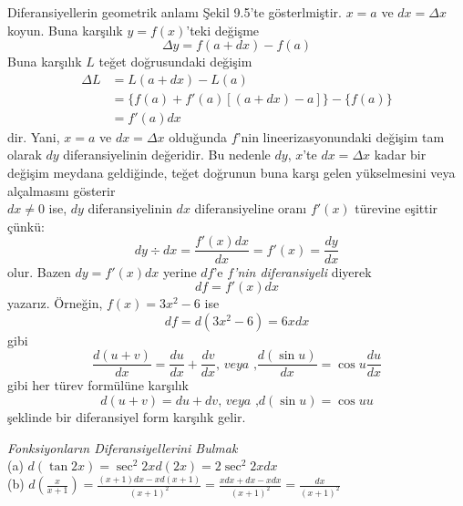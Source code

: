 Diferansiyellerin geometrik anlamı Şekil 9.5'te gösterlmiştir. $x=a$ ve $dx=\varDelta x$ koyun. Buna karşılık $y=f(x)$'teki değişme
	\begin{equation*}
	\varDelta y= f(a+dx)-f(a)
	\end{equation*}
Buna karşılık $L$ teğet doğrusundaki değişim
	\begin{equation*}
	\begin{split}
	\varDelta L&=L(a+dx)-L(a)\\
	&=\{f(a)+f'(a)[(a+dx)-a]\}-\{f(a)\}\\
	&=f'(a)dx
	\end{split}
	\end{equation*}
dir. Yani, $x=a$ ve $dx=\varDelta x$ olduğunda $f$'nin lineerizasyonundaki değişim tam olarak $dy$ diferansiyelinin değeridir. Bu nedenle $dy$, $x$'te $dx=\varDelta x$ kadar bir değişim meydana geldiğinde, teğet doğrunun buna karşı gelen yükselmesini veya alçalmasını gösterir\\
$dx \ne 0$ ise, $dy$ diferansiyelinin $dx$ diferansiyeline oranı $f'(x)$ türevine eşittir çünkü:
	\begin{equation*}
	dy \div dx = \frac{f'(x)dx}{dx}=f'(x)=\frac{dy}{dx}
	\end{equation*}
olur. Bazen $dy=f'(x)dx$ yerine $df$'e $f$\textit{'nin diferansiyeli} diyerek
	\begin{equation*}
	df=f'(x)dx
	\end{equation*}
yazarız. Örneğin, $f(x)=3x^2-6$ ise
	\begin{equation*}
	df=d(3x^2-6)=6x dx
	\end{equation*}
gibi
	\begin{equation*}
	\frac{d(u+v)}{dx}=\frac{du}{dx}+\frac{dv}{dx}\textit{,   veya   ,}\frac{d(\sin u)}{dx}=\cos u \frac{du}{dx}
	\end{equation*}
gibi her türev formülüne karşılık
	\begin{equation*}
	d(u+v)=du+dv\textit{,   veya   ,}d(\sin u) =\cos{u}u
	\end{equation*}
şeklinde bir diferansiyel form karşılık gelir.
\begin{ornek}\textit{Fonksiyonların Diferansiyellerini Bulmak}\\
(a)  $d(\tan{2x})=\sec^2{2x}d(2x)=2\sec^2{2x}dx$\\
(b)  $\displaystyle d\left(\frac{x}{x+1}\right)=\frac{(x+1)dx-x d(x+1)}{(x+1)^2}=\frac{xdx+dx-xdx}{(x+1)^2}=\frac{dx}{(x+1)^2}$
\end{ornek}
